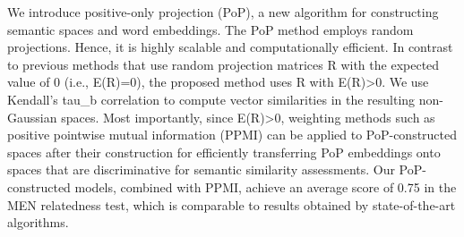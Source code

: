 We introduce positive-only projection (PoP), a new algorithm for constructing semantic spaces and word embeddings. The PoP method employs random projections. Hence, it is highly scalable and computationally efficient. In contrast to previous methods that use random projection matrices R with the expected value of 0 (i.e., E(R)=0), the proposed method uses R with E(R)>0. We use Kendall's tau\_b correlation to compute vector similarities in the resulting non-Gaussian spaces. Most importantly, since E(R)>0, weighting methods such as positive pointwise mutual information (PPMI) can be applied to PoP-constructed spaces after their construction for efficiently transferring PoP embeddings onto spaces that are discriminative for semantic similarity assessments. Our PoP-constructed models, combined with PPMI, achieve an average score of 0.75 in the MEN relatedness test, which is comparable to results obtained by state-of-the-art algorithms.
